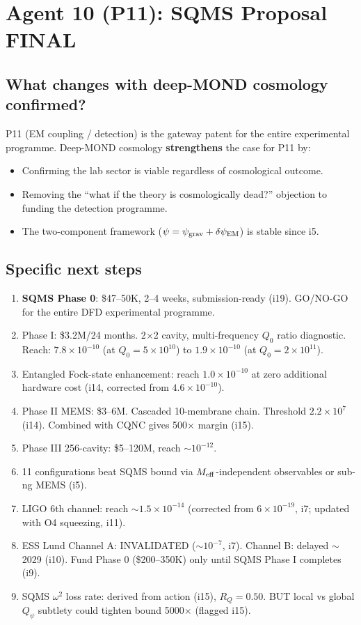 \documentclass[11pt]{article}
\begin{document}
\newpage
\section{Agent 10 (P11): SQMS Proposal FINAL}
\label{sec:agent10}

\subsection{What changes with deep-MOND cosmology confirmed?}

P11 (EM coupling / detection) is the gateway patent for the entire experimental
programme. Deep-MOND cosmology \textbf{strengthens} the case for P11 by:
\begin{itemize}
\item Confirming the lab sector is viable regardless of cosmological outcome.
\item Removing the ``what if the theory is cosmologically dead?'' objection to
funding the detection programme.
\item The two-component framework ($\psi = \psi_{\rm grav} + \delta\psi_{\rm EM}$)
is stable since i5.
\end{itemize}

\subsection{Specific next steps}
\begin{enumerate}
\item \textbf{SQMS Phase 0}: \$47--50K, 2--4 weeks, submission-ready (i19).
GO/NO-GO for the entire DFD experimental programme.
\item Phase I: \$3.2M/24 months. 2$\times$2 cavity, multi-frequency $Q_0$ ratio
diagnostic. Reach: $7.8 \times 10^{-10}$ (at $Q_0 = 5 \times 10^{10}$) to
$1.9 \times 10^{-10}$ (at $Q_0 = 2 \times 10^{11}$).
\item Entangled Fock-state enhancement: reach $1.0 \times 10^{-10}$ at zero
additional hardware cost (i14, corrected from $4.6 \times 10^{-10}$).
\item Phase II MEMS: \$3--6M. Cascaded 10-membrane chain. Threshold $2.2 \times 10^7$
(i14). Combined with CQNC gives 500$\times$ margin (i15).
\item Phase III 256-cavity: \$5--120M, reach $\sim 10^{-12}$.
\item 11 configurations beat SQMS bound via $M_{\rm eff}$-independent observables
or sub-ng MEMS (i5).
\item LIGO 6th channel: reach $\sim 1.5 \times 10^{-14}$ (corrected from $6 \times 10^{-19}$,
i7; updated with O4 squeezing, i11).
\item ESS Lund Channel A: INVALIDATED ($\sim 10^{-7}$, i7). Channel B: delayed
$\sim$2029 (i10). Fund Phase 0 (\$200--350K) only until SQMS Phase I completes (i9).
\item SQMS $\omega^2$ loss rate: derived from action (i15), $R_Q = 0.50$. BUT
local vs global $Q_\psi$ subtlety could tighten bound 5000$\times$ (flagged i15).
\end{enumerate}
\end{document}
